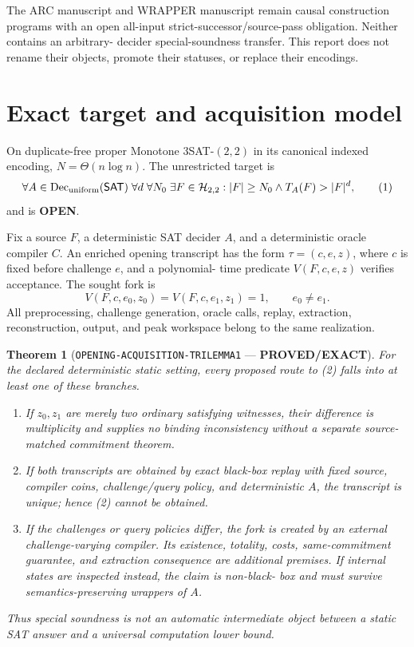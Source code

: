 \documentclass[11pt]{article}
\newtheorem{theorem}{Theorem}
\newcommand{\SAT}{\mathsf{SAT}}
\newcommand{\EXACT}{\textbf{PROVED/EXACT}}
\newcommand{\OPEN}{\textbf{OPEN}}
\begin{document}
The ARC manuscript  and WRAPPER manuscript
 remain causal construction programs with an open all-input
strict-successor/source-pass obligation.  Neither contains an arbitrary-
decider special-soundness transfer.  This report does not rename their
objects, promote their statuses, or replace their encodings.

\section{Exact target and acquisition model}
On duplicate-free proper Monotone $3$SAT-$(2,2)$ in its canonical indexed
encoding, $N=\Theta(n\log n)$.  The unrestricted target is
\[
 \forall A\in\operatorname{Dec}_{\rm uniform}(\SAT)\;
 \forall d\;\forall N_0\;\exists F\in\mathcal H_{2,2}:
 |F|\ge N_0\land T_A(F)>|F|^d,                         \tag{1}
\]
and is \OPEN.

Fix a source $F$, a deterministic SAT decider $A$, and a deterministic oracle
compiler $C$.  An enriched opening transcript has the form
\(\tau=(c,e,z)\), where $c$ is fixed before challenge $e$, and a polynomial-
time predicate $V(F,c,e,z)$ verifies acceptance.  The sought fork is
\[
 V(F,c,e_0,z_0)=V(F,c,e_1,z_1)=1,\qquad e_0\ne e_1.    \tag{2}
\]
All preprocessing, challenge generation, oracle calls, replay, extraction,
reconstruction, output, and peak workspace belong to the same realization.

\begin{theorem}[\texttt{OPENING-ACQUISITION-TRILEMMA1} --- \EXACT]
For the declared deterministic static setting, every proposed route to (2)
falls into at least one of these branches.
\begin{enumerate}[leftmargin=1.7em]
\item If $z_0,z_1$ are merely two ordinary satisfying witnesses, their
difference is multiplicity and supplies no binding inconsistency without a
separate source-matched commitment theorem.
\item If both transcripts are obtained by exact black-box replay with fixed
source, compiler coins, challenge/query policy, and deterministic $A$, the
transcript is unique; hence (2) cannot be obtained.
\item If the challenges or query policies differ, the fork is created by an
external challenge-varying compiler.  Its existence, totality, costs,
same-commitment guarantee, and extraction consequence are additional
premises.  If internal states are inspected instead, the claim is non-black-
box and must survive semantics-preserving wrappers of $A$.
\end{enumerate}
Thus special soundness is not an automatic intermediate object between a
static SAT answer and a universal computation lower bound.
\end{theorem}
\end{document}
